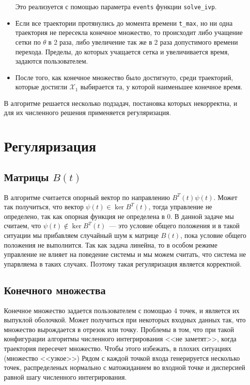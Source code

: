 \documentclass[12pt, a4paper]{article} %
\begin{document}
\begin{itemize}
        Это реализуется с помощью параметра \texttt{events} функции 
        \texttt{solve\_ivp}.
    \item Если все траектории протянулись до момента времени \texttt{t\_max},
        но ни одна траектория не пересекла конечное множество, то 
        происходит либо учащение сетки по $\theta$ в 2 раза, либо увеличение
        так же в 2 раза допустимого времени перехода. 
        Пределы, до которых учащается сетка и увеличивается время,
        задаются пользователем.
    \item После того, как конечное множество было достигнуто, среди 
        траекторий, которые достигли $\mathcal{X}_1$ выбирается та, у которой
        наименьшее конечное время.
\end{itemize} 

В алгоритме решается несколько подзадач, постановка которых некорректна, и
для их численного решения применяется регуляризация.

\section{Регуляризация}

\subsection{Матрицы $B(t)$}

В алгоритме считается опорный вектор по направлению $B^T(t)\psi(t)$.
Может так получиться, что вектор $\psi(t) \in \ker B^T(t)$, тогда управление 
не определено, так как опорная функция не определена в $0$.
В данной задаче мы считаем, что $\psi(t) \notin \ker B^T(t)$~--- это условие
общего положения и в такой ситуации мы прибавляем случайный шум к матрице 
$B(t)$, пока условие общего положения не выполнится.
Так как задача линейна, то в особом режиме управление не влияет на поведение
системы и мы можем считать, что система не упарвляема в таких случаях.
Поэтому такая регуляризация является корректной.

\subsection{Конечного множества}

Конечное множество задается пользователем с помощью 4 точек, и является их выпуклой оболочкой.
Может получиться при некоторых входных данных так, 
что множество вырождается в отрезок или точку.
Проблемы в том, что при такой конфигурации алгоритмы численного интегрирования
<<не заметят>>, когда траектория пересечет множество. 
Чтобы этого избежать, в плохих ситуациях (множество <<узкое>>) 
Рядом с каждой точкой входа генерируется несколько точек, распределеных 
нормально с матожиданием во входной точке и дисперсией равной шагу 
численного интегрирования.
\end{document}
